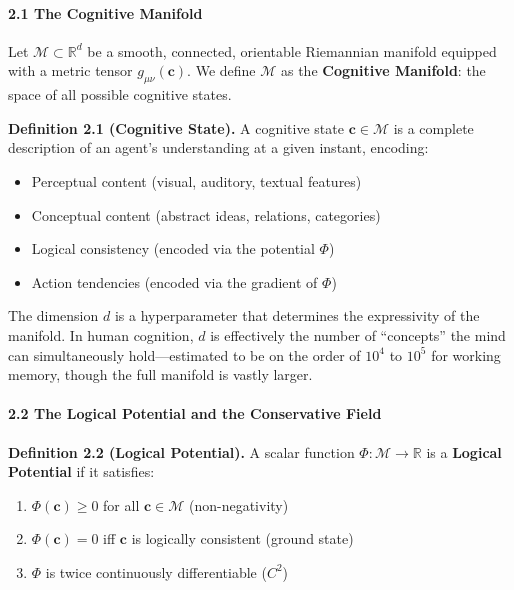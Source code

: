 \documentclass[
  11pt,
  a4paper,
]{article}
\providecommand{\tightlist}{%
  \setlength{\itemsep}{0pt}\setlength{\parskip}{0pt}}
\begin{document}
\paragraph{2.1 The Cognitive Manifold}\label{the-cognitive-manifold}

Let \(\mathcal{M} \subset \mathbb{R}^d\) be a smooth, connected,
orientable Riemannian manifold equipped with a metric tensor
\(g_{\mu\nu}(\mathbf{c})\). We define \(\mathcal{M}\) as the
\textbf{Cognitive Manifold}: the space of all possible cognitive states.

\textbf{Definition 2.1 (Cognitive State).} A cognitive state
\(\mathbf{c} \in \mathcal{M}\) is a complete description of an agent's
understanding at a given instant, encoding:

\begin{itemize}
\tightlist
\item
  Perceptual content (visual, auditory, textual features)
\item
  Conceptual content (abstract ideas, relations, categories)
\item
  Logical consistency (encoded via the potential \(\Phi\))
\item
  Action tendencies (encoded via the gradient of \(\Phi\))
\end{itemize}

The dimension \(d\) is a hyperparameter that determines the expressivity
of the manifold. In human cognition, \(d\) is effectively the number of
``concepts'' the mind can simultaneously hold---estimated to be on the
order of \(10^4\) to \(10^5\) for working memory, though the full
manifold is vastly larger.

\paragraph{2.2 The Logical Potential and the Conservative
Field}\label{the-logical-potential-and-the-conservative-field}

\textbf{Definition 2.2 (Logical Potential).} A scalar function
\(\Phi: \mathcal{M} \to \mathbb{R}\) is a \textbf{Logical Potential} if
it satisfies:

\begin{enumerate}
\def\labelenumi{\arabic{enumi}.}
\tightlist
\item
  \(\Phi(\mathbf{c}) \geq 0\) for all \(\mathbf{c} \in \mathcal{M}\)
  (non-negativity)
\item
  \(\Phi(\mathbf{c}) = 0\) iff \(\mathbf{c}\) is logically consistent
  (ground state)
\item
  \(\Phi\) is twice continuously differentiable (\(C^2\))
\end{enumerate}
\end{document}
